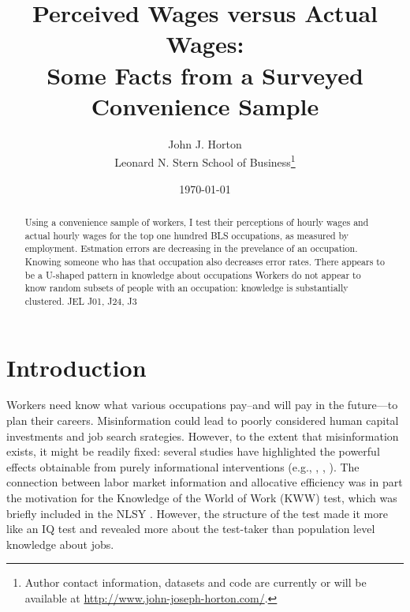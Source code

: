 \documentclass[11pt]{article}
\begin{document}
 

\title{Perceived Wages versus Actual Wages:\\ Some Facts from a Surveyed Convenience Sample}

\date{\today}

\author{ John J. Horton \\ Leonard N. Stern School of Business\footnote{Author contact information, datasets and code are currently or will be available at \href{http://www.john-joseph-horton.com/}{http://www.john-joseph-horton.com/}. } }
\maketitle

\begin{abstract}
\noindent  Using a convenience sample of workers, I test their perceptions of hourly wages and actual hourly wages for the top one hundred BLS occupations, as measured by employment. 
Estmation errors are decreasing in the prevelance of an occupation. 
Knowing someone who has that occupation also decreases error rates. 
There appears to be a U-shaped pattern in knowledge about occupations
Workers do not appear to know random subsets of people with an occupation: knowledge is substantially clustered. \newline 
\newline 
\noindent JEL J01, J24, J3
\end{abstract} 

\section{Introduction}

Workers need know what various occupations pay--and will pay in the future---to plan their careers. 
Misinformation could lead to poorly considered human capital investments and job search srategies. 
However, to the extent that misinformation exists, it might be readily fixed: 
several studies have highlighted the powerful effects obtainable from purely informational interventions (e.g., \cite{jensen2010perceived}, \cite{dupas2009teenagers}, \cite{card2010inequality}). 
The connection between labor market information and allocative efficiency was in part the motivation for the Knowledge of the World of Work (KWW) test, which was briefly included in the NLSY \cite{kohen1975}.  
However, the structure of the test made it more like an IQ test and revealed more about the test-taker than population level knowledge about jobs. 
\end{document}
